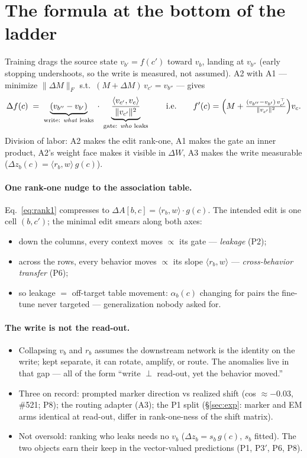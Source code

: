 \documentclass[11pt]{article}
\newcommand{\vc}{v_c}
\newcommand{\vb}{v_b}
\begin{document}
\section{The formula at the bottom of the ladder}
\label{sec:formula}

Training drags the source state $v_{b'} = f(c')$ toward $\vb$, landing at $v_{b''}$ (early stopping undershoots, so the write is measured, not assumed). A2 with A1 --- minimize $\lVert \Delta M \rVert_F$ s.t.\ $(M{+}\Delta M)\,v_{c'} = v_{b''}$ --- gives
\begin{equation}
\Delta f(c) \;=\; \underbrace{(v_{b''} - v_{b'})}_{\text{write: \emph{what} leaks}} \;\cdot\; \underbrace{\frac{\langle v_{c'}, \vc \rangle}{\lVert v_{c'} \rVert^{2}}}_{\text{gate: \emph{who} leaks}}
\qquad\text{i.e.}\qquad
f'(c) = \Big(M + \tfrac{(v_{b''}-v_{b'})\,v_{c'}^{\top}}{\lVert v_{c'}\rVert^{2}}\Big)\vc .
\label{eq:rank1}
\end{equation}
Division of labor: A2 makes the edit rank-one, A1 makes the gate an inner product, A2's weight face makes it visible in $\Delta W$, A3 makes the write measurable ($\Delta z_b(c) = \langle r_b, w \rangle\, g(c)$).

\paragraph{One rank-one nudge to the association table.} Eq.~\eqref{eq:rank1} compresses to $\Delta A[b,c] = \langle r_b, w \rangle \cdot g(c)$. The intended edit is one cell $(b, c')$; the minimal edit smears along both axes:
\begin{itemize}
\item down the columns, every context moves $\propto$ its gate --- \emph{leakage} (P2);
\item across the rows, every behavior moves $\propto$ its slope $\langle r_b, w \rangle$ --- \emph{cross-behavior transfer} (P6);
\item so leakage $=$ off-target table movement: $\alpha_b(c)$ changing for pairs the fine-tune never targeted --- generalization nobody asked for.
\end{itemize}

\paragraph{The write is not the read-out.}
\begin{itemize}
\item Collapsing $\vb$ and $r_b$ assumes the downstream network is the identity on the write; kept separate, it can rotate, amplify, or route. The anomalies live in that gap --- all of the form ``write $\perp$ read-out, yet the behavior moved.''
\item Three on record: prompted marker direction vs realized shift (cos $\approx -0.03$, \#521; P8); the routing adapter (A3); the P1 split (\S\ref{sec:exp}: marker and EM arms identical at read-out, differ in rank-one-ness of the shift matrix).
\item Not oversold: ranking who leaks needs no $\vb$ ($\Delta z_b = s_b\, g(c)$, $s_b$ fitted). The two objects earn their keep in the vector-valued predictions (P1, P3$'$, P6, P8).
\end{itemize}
\end{document}
